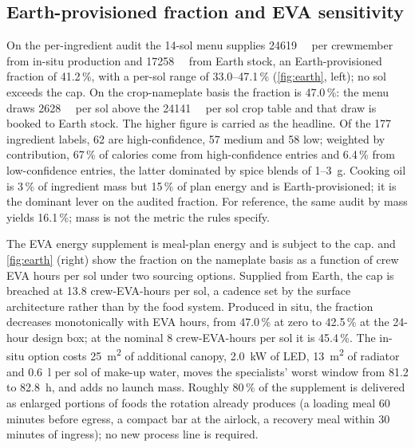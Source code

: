 \documentclass[11pt,a4paper,3p,authoryear]{elsarticle}
\begin{document}
\subsection{Earth-provisioned fraction and EVA sensitivity}

On the per-ingredient audit the 14-sol menu supplies \SI{24619}{\kilo\calorie} per crewmember from in-situ production and \SI{17258}{\kilo\calorie} from Earth stock, an Earth-provisioned fraction of 41.2\,\%, with a per-sol range of 33.0--47.1\,\% (\cref{fig:earth}, left); no sol exceeds the cap. On the crop-nameplate basis the fraction is 47.0\,\%: the menu draws \SI{2628}{\kilo\calorie} per sol above the \SI{24141}{\kilo\calorie} per sol crop table and that draw is booked to Earth stock. The higher figure is carried as the headline. Of the 177 ingredient labels, 62 are high-confidence, 57 medium and 58 low; weighted by contribution, 67\,\% of calories come from high-confidence entries and 6.4\,\% from low-confidence entries, the latter dominated by spice blends of 1--\SI{3}{\gram}. Cooking oil is 3\,\% of ingredient mass but 15\,\% of plan energy and is Earth-provisioned; it is the dominant lever on the audited fraction. For reference, the same audit by mass yields 16.1\,\%; mass is not the metric the rules specify.

The EVA energy supplement is meal-plan energy and is subject to the cap.  and \cref{fig:earth} (right) show the fraction on the nameplate basis as a function of crew EVA hours per sol under two sourcing options. Supplied from Earth, the cap is breached at 13.8 crew-EVA-hours per sol, a cadence set by the surface architecture rather than by the food system. Produced in situ, the fraction decreases monotonically with EVA hours, from 47.0\,\% at zero to 42.5\,\% at the 24-hour design box; at the nominal 8 crew-EVA-hours per sol it is 45.4\,\%. The in-situ option costs \SI{25}{\metre\squared} of additional canopy, \SI{2.0}{\kilo\watt} of LED, \SI{13}{\metre\squared} of radiator and \SI{0.6}{\litre} per sol of make-up water, moves the specialists' worst window from 81.2 to \SI{82.8}{\hour}, and adds no launch mass. Roughly 80\,\% of the supplement is delivered as enlarged portions of foods the rotation already produces (a loading meal 60 minutes before egress, a compact bar at the airlock, a recovery meal within 30 minutes of ingress); no new process line is required.
\end{document}
